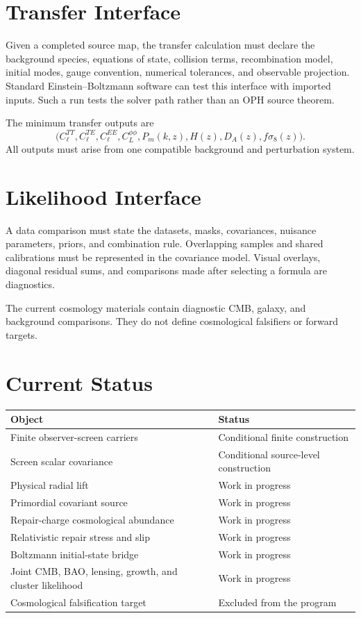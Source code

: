 \documentclass[11pt]{article}
\begin{document}
\section{Transfer Interface}

Given a completed source map, the transfer calculation must declare the
background species, equations of state, collision terms, recombination model,
initial modes, gauge convention, numerical tolerances, and observable
projection. Standard Einstein--Boltzmann software can test this interface with
imported inputs. Such a run tests the solver path rather than an OPH source
theorem.

The minimum transfer outputs are
\begin{equation}
\bigl(C_\ell^{TT},C_\ell^{TE},C_\ell^{EE},C_L^{\phi\phi},
P_m(k,z),H(z),D_A(z),f\sigma_8(z)\bigr).
\end{equation}
All outputs must arise from one compatible background and perturbation system.

\section{Likelihood Interface}

A data comparison must state the datasets, masks, covariances, nuisance
parameters, priors, and combination rule. Overlapping samples and shared
calibrations must be represented in the covariance model. Visual overlays,
diagonal residual sums, and comparisons made after selecting a formula are
diagnostics.

The current cosmology materials contain diagnostic CMB, galaxy, and background
comparisons. They do not define cosmological falsifiers or forward targets.

\section{Current Status}

\begin{center}
\begin{tabularx}{\textwidth}{@{}lX@{}}
\toprule
Object & Status \\
\midrule
Finite observer-screen carriers & Conditional finite construction \\
Screen scalar covariance & Conditional source-level construction \\
Physical radial lift & Work in progress \\
Primordial covariant source & Work in progress \\
Repair-charge cosmological abundance & Work in progress \\
Relativistic repair stress and slip & Work in progress \\
Boltzmann initial-state bridge & Work in progress \\
Joint CMB, BAO, lensing, growth, and cluster likelihood & Work in progress \\
Cosmological falsification target & Excluded from the program \\
\bottomrule
\end{tabularx}
\end{center}
\end{document}
